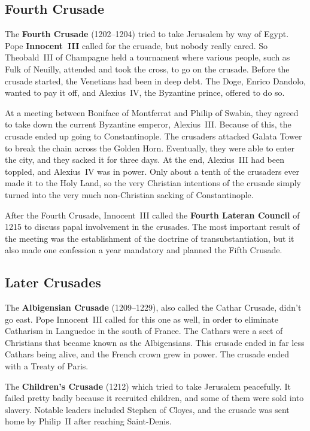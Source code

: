 \subsection*{Fourth Crusade}

The \textbf{Fourth Crusade} (1202--1204) tried to take Jerusalem by way of Egypt.
Pope \textbf{Innocent~III} called for the crusade, but nobody really cared.
So Theobald~III of Champagne held a tournament where various people, such as Fulk of Neuilly,
attended and took the cross, to go on the crusade.
Before the crusade started, the Venetians had been in deep debt.
The Doge, Enrico Dandolo, wanted to pay it off, and Alexius~IV, the Byzantine prince, offered to do so.

At a meeting between Boniface of Montferrat and Philip of Swabia,
they agreed to take down the current Byzantine emperor, Alexius~III\@.
Because of this, the crusade ended up going to Constantinople.
The crusaders attacked Galata Tower to break the chain across the Golden Horn.
Eventually, they were able to enter the city, and they sacked it for three days.
At the end, Alexius~III had been toppled, and Alexius~IV was in power.
Only about a tenth of the crusaders ever made it to the Holy Land,
so the very Christian intentions of the crusade simply turned into
the very much non-Christian sacking of Constantinople.

After the Fourth Crusade,
Innocent~III called the \textbf{Fourth Lateran Council} of 1215 to discuss papal involvement in the crusades.
The most important result of the meeting was the establishment of the doctrine of transubstantiation,
but it also made one confession a year mandatory and planned the Fifth Crusade.

\subsection*{Later Crusades}

The \textbf{Albigensian Crusade} (1209--1229), also called the Cathar Crusade, didn't go east.
Pope Innocent~III called for this one as well,
in order to eliminate Catharism in Languedoc in the south of France.
The Cathars were a sect of Christians that became known as the Albigensians.
This crusade ended in far less Cathars being alive, and the French crown grew in power.
The crusade ended with a Treaty of Paris.

The \textbf{Children's Crusade} (1212) which tried to take Jerusalem peacefully.
It failed pretty badly because it recruited children, and some of them were sold into slavery.
Notable leaders included Stephen of Cloyes, and the crusade was sent home by Philip~II after reaching Saint-Denis.

